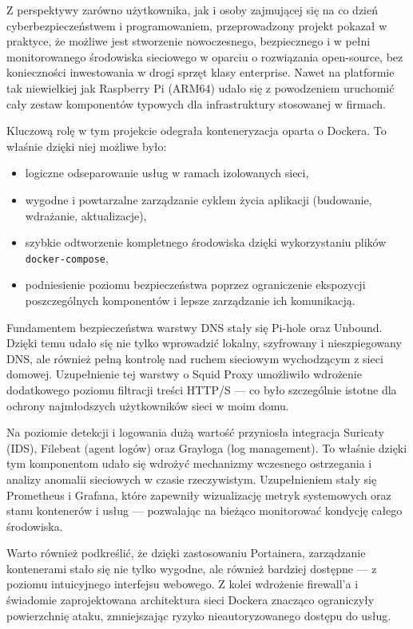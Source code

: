 \documentclass[
    left=2.5cm,         %
    right=2.5cm,        %
    top=2.5cm,          %
    bottom=3cm,         %
    bindingoffset=6mm,  %
    nohyphenation=true %
]{eiti/eiti-thesis} %
\begin{document}
Z perspektywy zarówno użytkownika, jak i osoby zajmującej się na co dzień cyberbezpieczeństwem i programowaniem, przeprowadzony projekt pokazał w praktyce, że możliwe jest stworzenie nowoczesnego, bezpiecznego i w pełni monitorowanego środowiska sieciowego w oparciu o rozwiązania open-source, bez konieczności inwestowania w drogi sprzęt klasy enterprise. Nawet na platformie tak niewielkiej jak Raspberry Pi (ARM64) udało się z powodzeniem uruchomić cały zestaw komponentów typowych dla infrastruktury stosowanej w firmach.

Kluczową rolę w tym projekcie odegrała konteneryzacja oparta o Dockera. To właśnie dzięki niej możliwe było:
\begin{itemize}
    \item logiczne odseparowanie usług w ramach izolowanych sieci,
    \item wygodne i powtarzalne zarządzanie cyklem życia aplikacji (budowanie, wdrażanie, aktualizacje),
    \item szybkie odtworzenie kompletnego środowiska dzięki wykorzystaniu plików \texttt{docker-compose},
    \item podniesienie poziomu bezpieczeństwa poprzez ograniczenie ekspozycji poszczególnych komponentów i lepsze zarządzanie ich komunikacją.
\end{itemize}

Fundamentem bezpieczeństwa warstwy DNS stały się Pi-hole oraz Unbound. Dzięki temu udało się nie tylko wprowadzić lokalny, szyfrowany i nieszpiegowany DNS, ale również pełną kontrolę nad ruchem sieciowym wychodzącym z sieci domowej. Uzupełnienie tej warstwy o Squid Proxy umożliwiło wdrożenie dodatkowego poziomu filtracji treści HTTP/S — co było szczególnie istotne dla ochrony najmłodszych użytkowników sieci w moim domu.

Na poziomie detekcji i logowania dużą wartość przyniosła integracja Suricaty (IDS), Filebeat (agent logów) oraz Grayloga (log management). To właśnie dzięki tym komponentom udało się wdrożyć mechanizmy wczesnego ostrzegania i analizy anomalii sieciowych w czasie rzeczywistym. Uzupełnieniem stały się Prometheus i Grafana, które zapewniły wizualizację metryk systemowych oraz stanu kontenerów i usług — pozwalając na bieżąco monitorować kondycję całego środowiska.

Warto również podkreślić, że dzięki zastosowaniu Portainera, zarządzanie kontenerami stało się nie tylko wygodne, ale również bardziej dostępne — z poziomu intuicyjnego interfejsu webowego. Z kolei wdrożenie firewall’a i świadomie zaprojektowana architektura sieci Dockera znacząco ograniczyły powierzchnię ataku, zmniejszając ryzyko nieautoryzowanego dostępu do usług.
\end{document}
